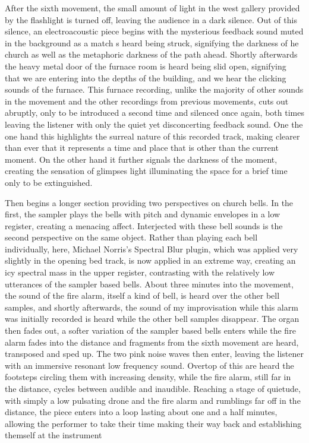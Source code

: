 \documentclass[12pt,twoside,maitrise]{dms_ks}
\theoremstyle{definition}
\begin{document}
After the sixth movement, the small amount of light in the west gallery provided by the flashlight is turned off, leaving the audience in a dark silence. 
Out of this silence, an electroacoustic piece begins with the mysterious feedback sound muted in the background as a match s heard being struck, signifying the darkness of he church as well as the metaphoric darkness of the path ahead. 
Shortly afterwards the heavy metal door of the furnace room is heard being slid open, signifying that we are entering into the depths of the building, and we hear the clicking sounds of the furnace. 
This furnace recording, unlike the majority of other sounds in the movement and the other recordings from previous movements, cuts out abruptly, only to be introduced a second time and silenced once again, both times leaving the listener with only the quiet yet disconcerting feedback sound. 
One the one hand this highlights the surreal nature of this recorded track, making clearer than ever that it represents a time and place that is other than the current moment. 
On the other hand it further signals the darkness of the moment, creating the sensation of glimpses light illuminating the space for a brief time only to be extinguished. 

Then begins a longer section providing two perspectives on church bells. 
In the first, the sampler plays the bells with pitch and dynamic envelopes in a low register, creating a menacing affect. 
Interjected with these bell sounds is the second perspective on the same object. 
Rather than playing each bell individually, here, Michael Norris's Spectral Blur plugin, which was applied very slightly in the opening bed track, is now applied in an extreme way, creating an icy spectral mass in the upper register, contrasting with the relatively low utterances of the sampler based bells. 
About three minutes into the movement, the sound of the fire alarm, itself a kind of bell, is heard over the other bell samples, and shortly afterwards, the sound of my improvisation while this alarm was initially recorded is heard while the other bell samples disappear. 
The organ then fades out, a softer variation of the sampler based bells enters while the fire alarm fades into the distance and fragments from the sixth movement are heard, transposed and sped up. 
The two pink noise waves then enter, leaving the listener with an immersive resonant low frequency sound. 
Overtop of this are heard the footsteps circling them with increasing density, while the fire alarm, still far in the distance, cycles between audible and inaudible. 
Reaching a stage of quietude, with simply a low pulsating drone and the fire alarm and rumblings far off in the distance, the piece enters into a loop lasting about one and a half minutes, allowing the performer to take their time making their way back and establishing themself at the instrument
\end{document}
